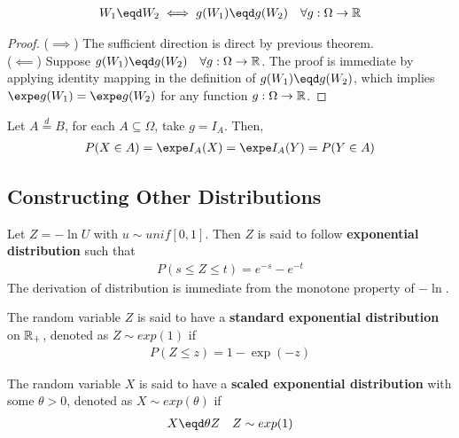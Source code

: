 \documentclass{article}
\begin{document}
   	\begin{theorem}[Invariance II]
   		\begin{align}
   			W_1 \eqd W_2 \iff g(W_1) \eqd g(W_2)\quad \forall g: \Omega \to \R
   		\end{align}
   	\end{theorem}
   	
   	\begin{proof}
   		($\implies$) The sufficient direction is direct by previous theorem. \\
   		($\impliedby$) Suppose $g(W_1) \eqd g(W_2)\quad \forall g: \Omega \to \R$. The proof is immediate by applying identity mapping in the definition of $g(W_1) \eqd g(W_2)$, which implies $\expe g(W_1) = \expe g(W_2)$ for any function $g: \Omega \to \mathbb{R}$.
   	\end{proof}

   	\begin{corollary}
   		Let $A \overset{d}{=} B$, for each $A \subseteq \Omega$, take $g = I_A$. Then,
	   	\begin{align}
	   		P(X \in A) = \expe I_A(X) = \expe I_A(Y) = P(Y \in A)
	   	\end{align}
   	\end{corollary}
   	
   	\subsection{Constructing Other Distributions}
   	
   	\begin{definition}
   		Let $Z = - \ln U$ with $u \sim unif[0,1]$. Then $Z$ is said to follow \textbf{exponential distribution} such that
   		\begin{align}
   			P(s \leq Z \leq t) = e^{-s} - e^{-t}
   		\end{align}
   		The derivation of distribution is immediate from the monotone property of $-\ln$.
   	\end{definition}
   	
   	\begin{definition}
   		The random variable $Z$ is said to have a \textbf{standard exponential distribution} on $\mathbb{R}_+$, denoted as $Z \sim exp(1)$ if
   		\begin{align}
   			P(Z \leq z) = 1 - \exp(-z)
   		\end{align}
   	\end{definition}
   	
   	\begin{definition}
   		The random variable $X$ is said to have a \textbf{scaled exponential distribution} with some $\theta > 0$, denoted as $X \sim exp(\theta)$ if
   		\begin{align}
   			X \eqd \theta Z\quad Z \sim exp(1)
   		\end{align}
   	\end{definition}
   	
\end{document}
